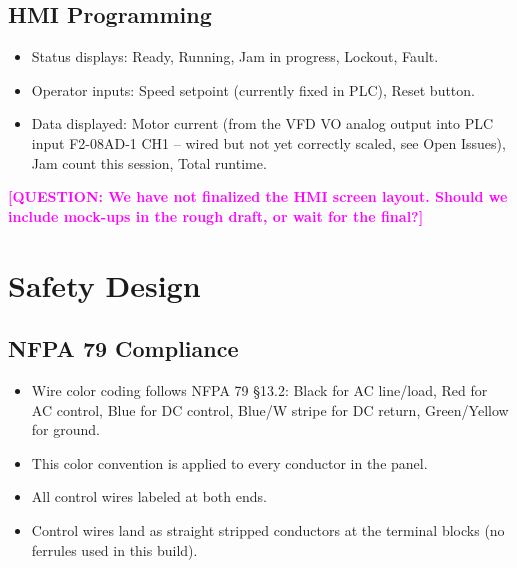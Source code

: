 \documentclass[hidelinks,12pt]{article}
\newcommand{\question}[1]{\textcolor{magenta}{\textbf{[QUESTION: #1]}}}
\begin{document}
\subsection{HMI Programming}
\begin{itemize}
    \item Status displays: Ready, Running, Jam in progress, Lockout, Fault.
    \item Operator inputs: Speed setpoint (currently fixed in PLC), Reset button.
    \item Data displayed: Motor current (from the VFD VO analog output into PLC input F2-08AD-1 CH1 -- wired but not yet correctly scaled, see Open Issues), Jam count this session, Total runtime.
\end{itemize}

\question{We have not finalized the HMI screen layout. Should we include mock-ups in the rough draft, or wait for the final?}

\section{Safety Design}

\subsection{NFPA 79 Compliance}
\begin{itemize}
    \item Wire color coding follows NFPA 79 §13.2: Black for AC line/load, Red for AC control, Blue for DC control, Blue/W stripe for DC return, Green/Yellow for ground.
    \item This color convention is applied to every conductor in the panel.
    \item All control wires labeled at both ends.
    \item Control wires land as straight stripped conductors at the terminal blocks (no ferrules used in this build).
\end{itemize}
\end{document}
